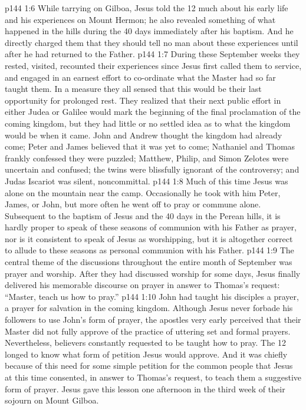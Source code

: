 \vs p144 1:6 \pc While tarrying on Gilboa, Jesus told the 12 much about his early life and his experiences on Mount Hermon; he also revealed something of what happened in the hills during the 40 days immediately after his baptism. And he directly charged them that they should tell no man about these experiences until after he had returned to the Father.
\vs p144 1:7 During these September weeks they rested, visited, recounted their experiences since Jesus first called them to service, and engaged in an earnest effort to co\hyp{}ordinate what the Master had so far taught them. In a measure they all sensed that this would be their last opportunity for prolonged rest. They realized that their next public effort in either Judea or Galilee would mark the beginning of the final proclamation of the coming kingdom, but they had little or no settled idea as to what the kingdom would be when it came. John and Andrew thought the kingdom had already come; Peter and James believed that it was yet to come; Nathaniel and Thomas frankly confessed they were puzzled; Matthew, Philip, and Simon Zelotes were uncertain and confused; the twins were blissfully ignorant of the controversy; and Judas Iscariot was silent, noncommittal.
\vs p144 1:8 \pc Much of this time Jesus was alone on the mountain near the camp. Occasionally he took with him Peter, James, or John, but more often he went off to pray or commune alone. Subsequent to the baptism of Jesus and the 40 days in the Perean hills, it is hardly proper to speak of these seasons of communion with his Father as prayer, nor is it consistent to speak of Jesus as worshipping, but it is altogether correct to allude to these seasons as personal communion with his Father.
\vs p144 1:9 The central theme of the discussions throughout the entire month of September was prayer and worship. After they had discussed worship for some days, Jesus finally delivered his memorable discourse on prayer in answer to Thomas’s request: “Master, teach us how to pray.”
\vs p144 1:10 John had taught his disciples a prayer, a prayer for salvation in the coming kingdom. Although Jesus never forbade his followers to use John’s form of prayer, the apostles very early perceived that their Master did not fully approve of the practice of uttering set and formal prayers. Nevertheless, believers constantly requested to be taught how to pray. The 12 longed to know what form of petition Jesus would approve. And it was chiefly because of this need for some simple petition for the common people that Jesus at this time consented, in answer to Thomas’s request, to teach them a suggestive form of prayer. Jesus gave this lesson one afternoon in the third week of their sojourn on Mount Gilboa.
